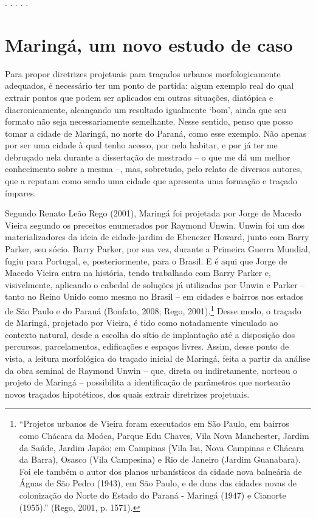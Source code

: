 \documentclass[12pt, a4paper]{book} %
\begin{document}
        \begin{center}
            . . . . .
        \end{center} 

        \chapter[Maringá, um novo estudo de caso]{Maringá, um novo estudo de caso}

        Para propor diretrizes projetuais para traçados urbanos morfologicamente adequados, é necessário ter um ponto de partida: algum exemplo real do qual extrair pontos que podem ser aplicados em outras situações, diatópica e diacronicamente, alcançando um resultado igualmente `bom', ainda que seu formato não seja necessariamente semelhante. Nesse sentido, penso que posso tomar a cidade de Maringá, no norte do Paraná, como esse exemplo. Não apenas por ser uma cidade à qual tenho acesso, por nela habitar, e por já ter me debruçado nela durante a dissertação de mestrado – o que me dá um melhor conhecimento sobre a mesma –, mas, sobretudo, pelo relato de diversos autores, que a reputam como sendo uma cidade que apresenta uma formação e traçado ímpares.

        Segundo Renato Leão Rego (2001), Maringá foi projetada por Jorge de Macedo Vieira segundo os preceitos enumerados por Raymond Unwin. Unwin foi um dos materializadores da ideia de cidade-jardim de Ebenezer Howard, junto com Barry Parker, seu sócio. Barry Parker, por sua vez, durante a Primeira Guerra Mundial, fugiu para Portugal, e, posteriormente, para o Brasil. E é aqui que Jorge de Macedo Vieira entra na história, tendo trabalhado com Barry Parker e, visivelmente, aplicando o cabedal de soluções já utilizadas por Unwin e Parker – tanto no Reino Unido como mesmo no Brasil – em cidades e bairros nos estados de São Paulo e do Paraná (Bonfato, 2008; Rego, 2001).\footnote[1]{``Projetos urbanos de Vieira foram executados em São Paulo, em bairros como Chácara da Moóca, Parque Edu Chaves, Vila Nova Manchester, Jardim 
        da Saúde, Jardim Japão; em Campinas (Vila Isa, 
        Nova Campinas e Chácara da Barra), Osasco (Vila 
        Campesina) e Rio de Janeiro (Jardim Guanabara). 
        Foi ele também o autor dos planos urbanísticos da 
        cidade nova balneária de Águas de São Pedro (1943), 
        em São Paulo, e de duas das cidades novas de 
        colonização do Norte do Estado do Paraná - 
        Maringá (1947) e Cianorte (1955).'' (Rego, 2001, p. 1571).} Desse modo, o traçado de Maringá, projetado por Vieira, é tido como notadamente vinculado ao contexto natural, desde a escolha do sítio de implantação até a disposição dos percursos, parcelamentos, edificações e espaços livres. Assim, desse ponto de vista, a leitura morfológica do traçado inicial de Maringá, feita a partir da análise da obra seminal de Raymond Unwin – que, direta ou indiretamente, norteou o projeto de Maringá – possibilita a identificação de parâmetros que nortearão novos traçados hipotéticos, dos quais extrair diretrizes projetuais.
\end{document}
